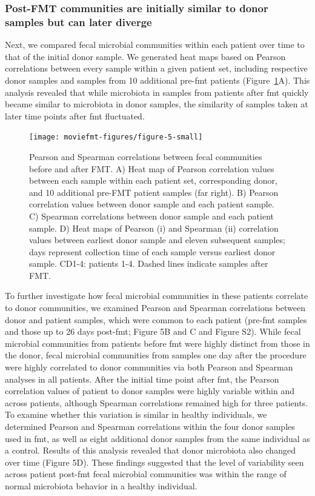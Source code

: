 \subsubsection{Post-FMT communities are initially similar to donor samples but can later diverge}

Next, we compared fecal microbial communities within each patient over time to that of the initial donor sample. We generated heat maps based on Pearson correlations between every sample within a given patient set, including respective donor samples and samples from 10 additional pre-\gls{fmt} patients (Figure~\ref{moviefmt-fig5}A). This analysis revealed that while microbiota in samples from patients after \gls{fmt} quickly became similar to microbiota in donor samples, the similarity of samples taken at later time points after \gls{fmt} fluctuated.

\begin{figure}
\texttt{[image: moviefmt-figures/figure-5-small]}
\caption[Pearson and Spearman correlations between fecal communities before and after FMT.]{Pearson and Spearman correlations between fecal communities before and after FMT. A) Heat map of Pearson correlation values between each sample within each patient set, corresponding donor, and 10 additional pre-FMT patient samples (far right). B) Pearson correlation values between donor sample and each patient sample. C) Spearman correlations between donor sample and each patient sample. D) Heat maps of Pearson (i) and Spearman (ii) correlation values between earliest donor sample and eleven subsequent samples; days represent collection time of each sample versus earliest donor sample. CD1-4: patients 1-4. Dashed lines indicate samples after FMT.}
\label{moviefmt-fig5}
\end{figure}

To further investigate how fecal microbial communities in these patients correlate to donor communities, we examined Pearson and Spearman correlations between donor and patient samples, which were common to each patient (pre-\gls{fmt} samples and those up to 26 days post-\gls{fmt}; Figure 5B and C and Figure S2). While fecal microbial communities from patients before \gls{fmt} were highly distinct from those in the donor, fecal microbial communities from samples one day after the procedure were highly correlated to donor communities via both Pearson and Spearman analyses in all patients. After the initial time point after \gls{fmt}, the Pearson correlation values of patient to donor samples were highly variable within and across patients, although Spearman correlations remained high for three patients. To examine whether this variation is similar in healthy individuals, we determined Pearson and Spearman correlations within the four donor samples used in \gls{fmt}, as well as eight additional donor samples from the same individual as a control. Results of this analysis revealed that donor microbiota also changed over time (Figure 5D). These findings suggested that the level of variability seen across patient post-\gls{fmt} fecal microbial communities was within the range of normal microbiota behavior in a healthy individual.


